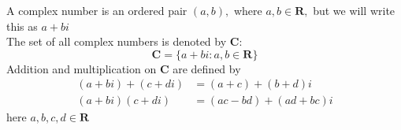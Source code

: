 
A complex number is an ordered pair $(a, b),$ where $a, b \in \mathbf{R},$ but we will write this as $a+b i$ \\
The set of all complex numbers is denoted by $\mathbf{C}:$
$$
\mathbf{C}=\{a+b i: a, b \in \mathbf{R}\}
$$
Addition and multiplication on $\mathbf{C}$ are defined by
$$
\begin{aligned}
(a+b i)+(c+d i) &=(a+c)+(b+d) i \\
(a+b i)(c+d i) &=(a c-b d)+(a d+b c) i
\end{aligned}
$$
here $a, b, c, d \in \mathbf{R}$ \\

